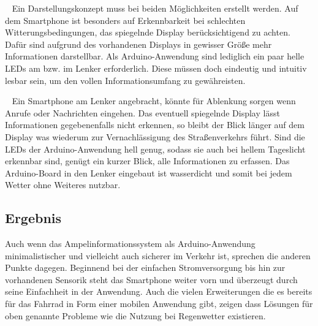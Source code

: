\begin{description}[leftmargin=0.7cm,style=nextline]
  \item[Darstellung] ~ Ein Darstellungskonzept muss bei beiden Möglichkeiten erstellt werden. Auf dem \gls{Smartphone} ist besonders auf Erkennbarkeit bei schlechten Witterungsbedingungen, das spiegelnde Display berücksichtigend zu achten. Dafür sind aufgrund des vorhandenen Displays in gewisser Größe mehr Informationen darstellbar. Als \gls{Arduino}-Anwendung sind lediglich ein paar helle \glspl{LED} am bzw. im Lenker erforderlich. Diese müssen doch eindeutig und intuitiv lesbar sein, um den vollen Informationsumfang zu gewähreisten.\\
  \item[Verkehrssicherheit] ~ Ein \gls{Smartphone} am Lenker angebracht, könnte für Ablenkung sorgen wenn Anrufe oder Nachrichten eingehen. Das eventuell spiegelnde Display lässt Informationen gegebenenfalls nicht erkennen, so bleibt der Blick länger auf dem Display was wiederum zur Vernachlässigung des Straßenverkehrs führt. Sind die \glspl{LED} der \gls{Arduino}-Anwendung hell genug, sodass sie auch bei hellem Tageslicht erkennbar sind, genügt ein kurzer Blick, alle Informationen zu erfassen. Das \gls{Arduino}-Board in den Lenker eingebaut ist wasserdicht und somit bei jedem Wetter ohne Weiteres nutzbar.\\ 
\end{description}
\subsection*{Ergebnis}  
Auch wenn das Ampelinformationssystem als \gls{Arduino}-Anwendung minimalistischer und vielleicht auch sicherer im Verkehr ist, sprechen die anderen Punkte dagegen. Beginnend bei der einfachen Stromversorgung bis hin zur vorhandenen Sensorik steht das \gls{Smartphone} weiter vorn und überzeugt durch seine Einfachheit in der Anwendung. Auch die vielen Erweiterungen die es bereits für das Fahrrad in Form einer mobilen Anwendung gibt, zeigen dass Lösungen für oben genannte Probleme wie die Nutzung bei Regenwetter existieren. 
